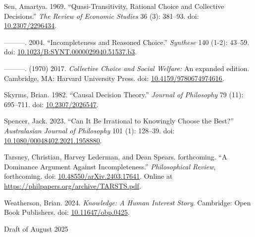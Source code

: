\documentclass[
  11pt,
  letterpaper,
  DIV=11,
  numbers=noendperiod,
  twoside]{scrartcl}
\newlength{\cslhangindent}
\newenvironment{CSLReferences}[2] %
 {\begin{list}{}{%
  \setlength{\itemindent}{0pt}
  \setlength{\leftmargin}{0pt}
  \setlength{\parsep}{0pt}
  \ifodd #1
   \setlength{\leftmargin}{\cslhangindent}
   \setlength{\itemindent}{-1\cslhangindent}
  \fi
  \setlength{\itemsep}{#2\baselineskip}}}
 {\end{list}}
\begin{document}
\begin{CSLReferences}{1}{0}
Sen, Amartya. 1969. {``Quasi-Transitivity, Rational Choice and
Collective Decisions.''} \emph{The Review of Economic Studies} 36 (3):
381--93. doi: \href{https://doi.org/10.2307/2296434}{10.2307/2296434}.

---------. 2004. {``Incompleteness and Reasoned Choice.''}
\emph{Synthese} 140 (1-2): 43--59. doi:
\href{https://doi.org/10.1023/B:SYNT.0000029940.51537.b3}{10.1023/B:SYNT.0000029940.51537.b3}.

---------. (1970) 2017. \emph{Collective Choice and Social Welfare:} An
expanded edition. Cambridge, MA: Harvard University Press. doi:
\href{https://doi.org/10.4159/9780674974616}{10.4159/9780674974616}.

Skyrms, Brian. 1982. {``Causal Decision Theory.''} \emph{Journal of
Philosophy} 79 (11): 695--711. doi:
\href{https://doi.org/10.2307/2026547}{10.2307/2026547}.

Spencer, Jack. 2023. {``Can It Be Irrational to Knowingly Choose the
Best?''} \emph{Australasian Journal of Philosophy} 101 (1): 128--39.
doi:
\href{https://doi.org/10.1080/00048402.2021.1958880}{10.1080/00048402.2021.1958880}.

Tarsney, Christian, Harvey Lederman, and Dean Spears. forthcoming. {``A
Dominance Argument Against Incompleteness.''} \emph{Philosophical
Review}, forthcoming. doi:
\href{https://doi.org/10.48550/arXiv.2403.17641}{10.48550/arXiv.2403.17641}.
Online at \url{https://philpapers.org/archive/TARSTS.pdf}.

Weatherson, Brian. 2024. \emph{Knowledge: A Human Interest Story}.
Cambridge: Open Book Publishers. doi:
\href{https://doi.org/10.11647/obp.0425}{10.11647/obp.0425}.

\end{CSLReferences}



\noindent Draft of August 2025
\end{document}
